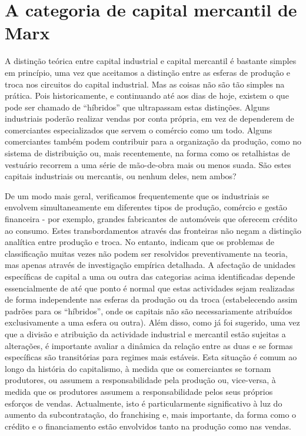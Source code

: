 \section{A categoria de capital mercantil de Marx}
 \par 
A distinção teórica entre capital industrial e capital mercantil é bastante simples em princípio, uma vez que aceitamos a distinção entre as esferas de produção e troca nos circuitos do capital industrial. Mas as coisas não são tão simples na prática. Pois historicamente, e continuando até aos dias de hoje, existem o que pode ser chamado de “híbridos” que ultrapassam estas distinções. Alguns industriais poderão realizar vendas por conta própria, em vez de dependerem de comerciantes especializados que servem o comércio como um todo. Alguns comerciantes também podem contribuir para a organização da produção, como no sistema de distribuição ou, mais recentemente, na forma como os retalhistas de vestuário recorrem a uma série de mão-de-obra mais ou menos suada. São estes capitais industriais ou mercantis, ou nenhum deles, nem ambos?
 \par 
De um modo mais geral, verificamos frequentemente que os industriais se envolvem simultaneamente em diferentes tipos de produção, comércio e gestão financeira - por exemplo, grandes fabricantes de automóveis que oferecem crédito ao consumo. Estes transbordamentos através das fronteiras não negam a distinção analítica entre produção e troca. No entanto, indicam que os problemas de classificação muitas vezes não podem ser resolvidos preventivamente na teoria, mas apenas através de investigação empírica detalhada. A afectação de unidades específicas de capital a uma ou outra das categorias acima identificadas depende essencialmente de até que ponto é normal que estas actividades sejam realizadas de forma independente nas esferas da produção ou da troca (estabelecendo assim padrões para os “híbridos”, onde os capitais não são necessariamente atribuídos exclusivamente a uma esfera ou outra). Além disso, como já foi sugerido, uma vez que a divisão e atribuição da actividade industrial e mercantil estão sujeitas a alterações, é importante avaliar a dinâmica da relação entre as duas e se formas específicas são transitórias para regimes mais estáveis. Esta situação é comum ao longo da história do capitalismo, à medida que os comerciantes se tornam produtores, ou assumem a responsabilidade pela produção ou, vice-versa, à medida que os produtores assumem a responsabilidade pelos seus próprios esforços de vendas. Actualmente, isto é particularmente significativo à luz do aumento da subcontratação, do franchising e, mais importante, da forma como o crédito e o financiamento estão envolvidos tanto na produção como nas vendas.
